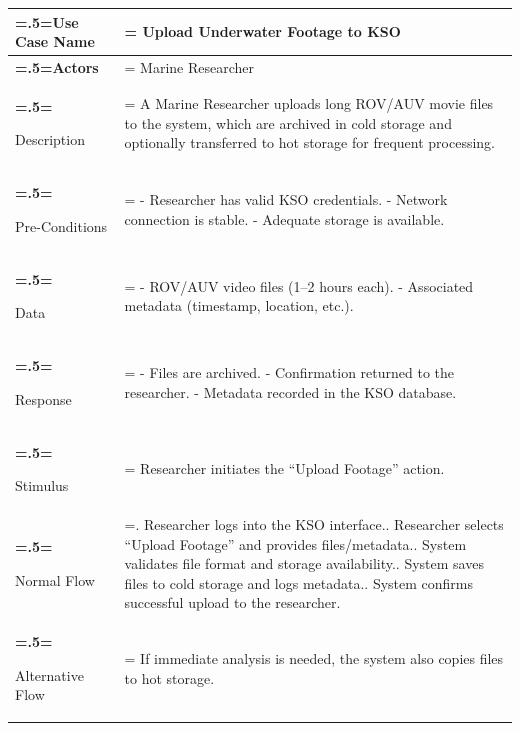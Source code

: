 \begin{table}[H] 
    \centering
    \small
    \begin{tabularx}{\textwidth}{|>{\bfseries\hsize=.5\hsize\linewidth=\hsize}X|
    >{\hsize=1.5\hsize\linewidth=\hsize}X|}
    \hline
    Use Case Name       & Upload Underwater Footage to KSO \\ \hline
    
    Actors              & Marine Researcher \\ \hline
    
    Description         & A Marine Researcher uploads long ROV/AUV movie files to the system, 
    which are archived in cold storage and optionally transferred to hot 
    storage for frequent processing.  \\ \hline
    
    Pre-Conditions      & 
    - Researcher has valid KSO credentials.\newline
    - Network connection is stable.\newline
    - Adequate storage is available. \\ \hline
    
    Data                & 
    - ROV/AUV video files (1--2 hours each).\newline
    - Associated metadata (timestamp, location, etc.). \\ \hline
    
    Response            & 
    - Files are archived.\newline
    - Confirmation returned to the researcher.\newline
    - Metadata recorded in the KSO database. \\ \hline
    
    Stimulus            & Researcher initiates the ``Upload Footage'' action. \\ \hline
    
    Normal Flow         & 
    1. Researcher logs into the KSO interface.\newline
    2. Researcher selects ``Upload Footage'' and provides files/metadata.\newline
    3. System validates file format and storage availability.\newline
    4. System saves files to cold storage and logs metadata.\newline
    5. System confirms successful upload to the researcher. \\ \hline
    
    Alternative Flow    & If immediate analysis is needed, the system also copies files to hot storage. \\ \hline
    

\end{tabularx}
\end{table}
